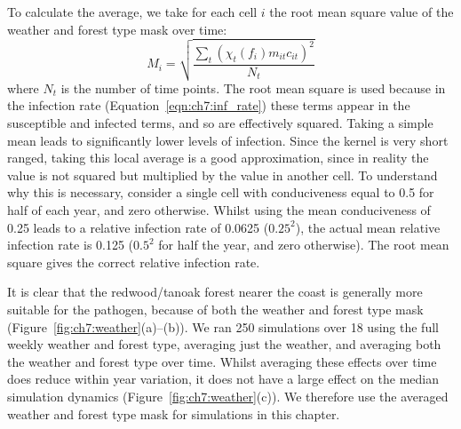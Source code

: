 To calculate the average, we take for each cell $i$ the root mean square value of the weather and forest type mask over time:
\begin{equation}
    M_i = \sqrt{\frac{\sum_t\left(\chi_t(f_i)m_{it}c_{it}\right)^2}{N_t}}
\end{equation}
where $N_t$ is the number of time points. The root mean square is used because in the infection rate (Equation~\ref{eqn:ch7:inf_rate}) these terms appear in the susceptible and infected terms, and so are effectively squared. Taking a simple mean leads to significantly lower levels of infection. Since the kernel is very short ranged, taking this local average is a good approximation, since in reality the value is not squared but multiplied by the value in another cell. To understand why this is necessary, consider a single cell with conduciveness equal to 0.5 for half of each year, and zero otherwise. Whilst using the mean conduciveness of 0.25 leads to a relative infection rate of 0.0625 ($0.25^2$), the actual mean relative infection rate is 0.125 ($0.5^2$ for half the year, and zero otherwise). The root mean square gives the correct relative infection rate.

It is clear that the redwood/tanoak forest nearer the coast is generally more suitable for the pathogen, because of both the weather and forest type mask (Figure~\ref{fig:ch7:weather}(a)--(b)). We ran 250 simulations over \SI{18}{\years} using the full weekly weather and forest type, averaging just the weather, and averaging both the weather and forest type over time. Whilst averaging these effects over time does reduce within year variation, it does not have a large effect on the median simulation dynamics (Figure~\ref{fig:ch7:weather}(c)). We therefore use the averaged weather and forest type mask for simulations in this chapter.

